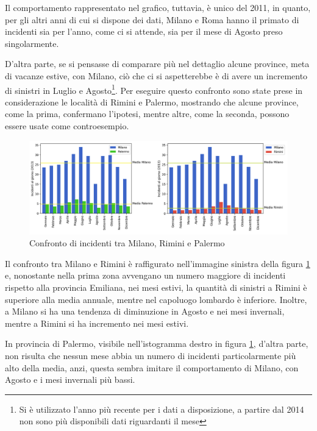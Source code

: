 \documentclass[a4paper]{report}
\begin{document}
Il comportamento rappresentato nel grafico, tuttavia, è unico del 2011, in quanto, 
per gli altri anni di cui si dispone dei dati, 
Milano e Roma hanno il primato di incidenti sia per l'anno, come ci si attende, sia per il 
mese di Agosto preso singolarmente. 


D'altra parte, se si pensasse di comparare più nel dettaglio alcune province, 
meta di vacanze estive, con Milano, ciò che ci si aspetterebbe è 
di avere un incremento di sinistri in Luglio e 
Agosto\footnote{Si è utilizzato l'anno più recente per i dati a disposizione, 
a partire dal 2014 non sono più disponibili dati riguardanti il mese}. 
Per eseguire questo confronto sono state prese in considerazione le 
località di Rimini e Palermo, mostrando che alcune province, come la prima, 
confermano l'ipotesi, mentre altre, 
come la seconda, possono essere usate come controesempio. 

\begin{figure}
    \includegraphics[width=\linewidth]{img_unite/milano_rimini_palermo.png}
    \caption{Confronto di incidenti tra Milano, Rimini e Palermo}
    \label{fig:milano-rimini}
\end{figure}

Il confronto tra Milano e Rimini è raffigurato nell'immagine sinistra della 
figura \ref{fig:milano-rimini} e, nonostante nella prima zona 
avvengano un numero maggiore di 
incidenti rispetto alla provincia Emiliana, nei mesi estivi, 
la quantità di sinistri a Rimini è superiore alla media annuale, 
mentre nel capoluogo lombardo è inferiore. 
Inoltre, a Milano si ha una tendenza di diminuzione in Agosto e nei 
mesi invernali, mentre a Rimini si ha incremento nei mesi estivi. 

In provincia di Palermo, visibile nell'istogramma destro in figura \ref{fig:milano-rimini}, 
d'altra parte, non risulta che nessun mese abbia un numero di incidenti 
particolarmente più alto della media, anzi, questa sembra imitare il comportamento di 
Milano, con Agosto e i mesi invernali più bassi. 
\end{document}
